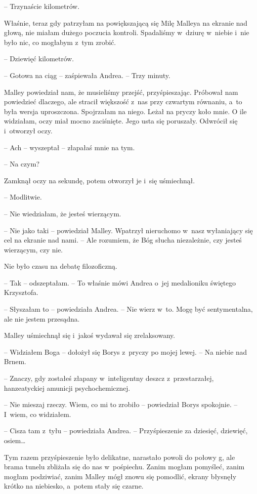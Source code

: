 \documentclass[oneside,polish,11pt,sfheadings]{mwbk}
\begin{document}
-- Trzynaście kilometrów.

Właśnie, teraz gdy patrzyłam na powiększającą się Milę Malleya na
ekranie nad głową, nie miałam dużego poczucia kontroli. Spadaliśmy w~dziurę w~niebie i~nie było nic, co mogłabym z~tym zrobić.

-- Dziewięć kilometrów.

-- Gotowa na ciąg -- zaśpiewała Andrea. -- Trzy minuty.

Malley powiedział nam, że musieliśmy przejść, przyśpieszając. Próbował
nam powiedzieć dlaczego, ale stracił większość z~nas przy czwartym
równaniu, a~to była wersja uproszczona. Spojrzałam na niego. Leżał na
pryczy koło mnie. O ile widziałam, oczy miał mocno zaciśnięte. Jego usta
się poruszały. Odwrócił się i~otworzył oczy.

-- Ach -- wyszeptał -- złapałaś mnie na tym.

-- Na czym?

Zamknął oczy na sekundę, potem otworzył je i~się uśmiechnął. 


-- Modlitwie.

-- Nie wiedziałam, że jesteś wierzącym.

-- Nie jako taki -- powiedział Malley. Wpatrzył nieruchomo w~nasz
wyłaniający się cel na ekranie nad nami. -- Ale rozumiem, że Bóg słucha
niezależnie, czy jesteś wierzącym, czy nie.

Nie było czasu na debatę filozoficzną. 

-- Tak -- odszeptałam. -- To właśnie
mówi Andrea o~jej medalioniku świętego Krzysztofa.

-- Słyszałam to -- powiedziała Andrea. -- Nie wierz w~to. Mogę być
sentymentalna, ale nie jestem przesądna.

Malley uśmiechnął się i~jakoś wydawał się zrelaksowany.

-- Widziałem Boga -- dołożył się Borys z~pryczy po mojej lewej. -- Na
niebie nad Brnem.

-- Znaczy, gdy zostałeś złapany w~inteligentny deszcz z~przestarzałej,
hanzeatyckiej amunicji psychochemicznej. 

-- Nie mieszaj rzeczy. Wiem, co mi to zrobiło -- powiedział Borys spokojnie. -- I~wiem, co
widziałem.

-- Cisza tam z~tyłu -- powiedziała Andrea. -- Przyśpieszenie za dziesięć,
dziewięć, osiem\ldots 

Tym razem przyśpieszenie było delikatne, narastało powoli do połowy g,
ale brama tunelu zbliżała się do nas w~pośpiechu. Zanim mogłam pomyśleć,
zanim mogłam podziwiać, zanim Malley mógł znowu się pomodlić, ekrany
błysnęły krótko na niebiesko, a~potem stały się czarne.
\end{document}
